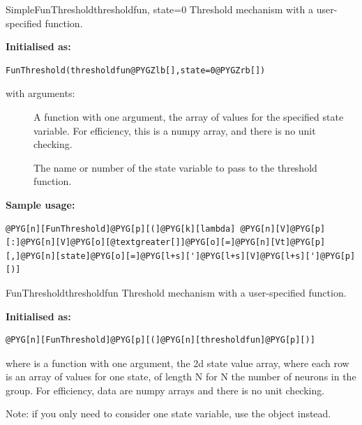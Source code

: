 \documentclass[letterpaper,10pt,english]{manual}
\begin{document}
\hypertarget{brian.SimpleFunThreshold}{}\begin{classdesc}{SimpleFunThreshold}{thresholdfun, state=0}
Threshold mechanism with a user-specified function.

\textbf{Initialised as:}

\begin{Verbatim}[commandchars=@\[\]]
FunThreshold(thresholdfun@PYGZlb[],state=0@PYGZrb[])
\end{Verbatim}

with arguments:
\begin{description}
\item[] \leavevmode
A function with one argument, the array of values for
the specified state variable. For efficiency, this is
a numpy array, and there is no unit checking.

\item[] \leavevmode
The name or number of the state variable to pass to
the threshold function.

\end{description}

\textbf{Sample usage:}

\begin{Verbatim}[commandchars=@\[\]]
@PYG[n][FunThreshold]@PYG[p][(]@PYG[k][lambda] @PYG[n][V]@PYG[p][:]@PYG[n][V]@PYG[o][@textgreater[]]@PYG[o][=]@PYG[n][Vt]@PYG[p][,]@PYG[n][state]@PYG[o][=]@PYG[l+s][']@PYG[l+s][V]@PYG[l+s][']@PYG[p][)]
\end{Verbatim}
\end{classdesc}

\hypertarget{brian.FunThreshold}{}\begin{classdesc}{FunThreshold}{thresholdfun}
Threshold mechanism with a user-specified function.

\textbf{Initialised as:}

\begin{Verbatim}[commandchars=@\[\]]
@PYG[n][FunThreshold]@PYG[p][(]@PYG[n][thresholdfun]@PYG[p][)]
\end{Verbatim}

where  is a function with one argument,
the 2d state value array, where each row is an array of
values for one state, of length N for N the number of
neurons in the group. For efficiency, data are numpy
arrays and there is no unit checking.

Note: if you only need to consider one state variable,
use the \hyperlink{brian.SimpleFunThreshold}{} object instead.
\end{classdesc}
\end{document}
